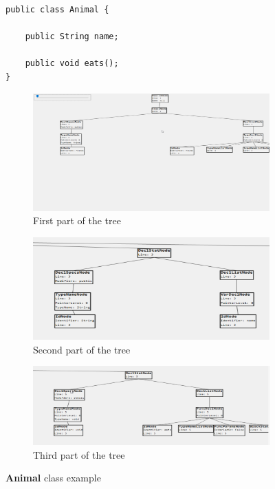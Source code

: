 \documentclass[a4paper]{article}
\begin{document}
\begin{figure}[h!]
\begin{center}
\begin{lstlisting}
public class Animal {

	public String name;
	
	public void eats();
}
\end{lstlisting}
     \centering
     \begin{subfigure}[b]{\textwidth}
         \centering
         \includegraphics[width=\textwidth]{animal_ast1}
         \caption{First part of the tree}
     \end{subfigure}
     \quad
     \begin{subfigure}[b]{\textwidth}
         \centering
         \includegraphics[width=\textwidth]{animal_ast2}
         \caption{Second part of the tree}
     \end{subfigure}
     \begin{subfigure}[b]{\textwidth}
         \centering
         \includegraphics[width=\textwidth]{animal_ast3}
         \caption{Third part of the tree}
     \end{subfigure}

\caption{\textbf{Animal} class example}
\label{fig:ast3}
\end{center}
\end{figure}
\end{document}
